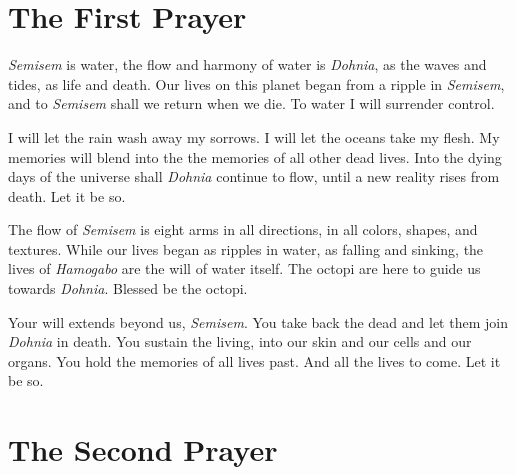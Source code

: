 \documentclass[12pt, letterpaper]{report}
\begin{document}
\section{The First Prayer}

\begin{poem}
\begin{stanza}
\textit{Semisem} is water,\verseline
the flow and harmony of water is \textit{Dohnia},\verseline
as the waves and tides, as life and death.\verseline
Our lives on this planet began from a ripple in \textit{Semisem},\verseline
and to \textit{Semisem} shall we return when we die.\verseline
To water I will surrender control.
\end{stanza}
\begin{stanza}
I will let the rain wash away my sorrows.\verseline
I will let the oceans take my flesh.\verseline
My memories will blend into the the memories of all other dead lives.\verseline
Into the dying days of the universe shall \textit{Dohnia} continue to flow,\verseline
until a new reality rises from death.\verseline
Let it be so.
\end{stanza}
\begin{stanza}
The flow of \textit{Semisem} is eight arms in all directions,\verseline
in all colors, shapes, and textures.\verseline
While our lives began as ripples in water, as falling and sinking,\verseline
the lives of \textit{Hamogabo} are the will of water itself.\verseline
The octopi are here to guide us towards \textit{Dohnia}.\verseline
Blessed be the octopi.
\end{stanza}
\begin{stanza}
Your will extends beyond us, \textit{Semisem}.\verseline
You take back the dead and let them join \textit{Dohnia} in death.\verseline
You sustain the living, into our skin and our cells and our organs.\verseline
You hold the memories of all lives past.\verseline
And all the lives to come.\verseline
Let it be so.
\end{stanza}
\end{poem}

\section{The Second Prayer}
\end{document}
